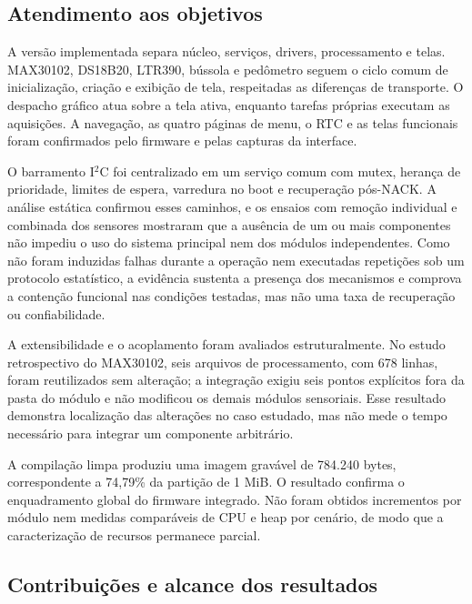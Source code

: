 \documentclass[a4paper,12pt]{article}
\begin{document}
\subsection{Atendimento aos objetivos}


A vers\~ao implementada separa n\'ucleo, servi\c{c}os, drivers, processamento e telas. MAX30102, DS18B20, LTR390, b\'ussola e ped\^ometro seguem o ciclo comum de inicializa\c{c}\~ao, cria\c{c}\~ao e exibi\c{c}\~ao de tela, respeitadas as diferen\c{c}as de transporte. O despacho gr\'afico atua sobre a tela ativa, enquanto tarefas pr\'oprias executam as aquisi\c{c}\~oes. A navega\c{c}\~ao, as quatro p\'aginas de menu, o RTC e as telas funcionais foram confirmados pelo firmware e pelas capturas da interface.


O barramento I$^2$C foi centralizado em um servi\c{c}o comum com mutex, heran\c{c}a de prioridade, limites de espera, varredura no boot e recupera\c{c}\~ao p\'os-NACK. A an\'alise est\'atica confirmou esses caminhos, e os ensaios com remo\c{c}\~ao individual e combinada dos sensores mostraram que a aus\^encia de um ou mais componentes n\~ao impediu o uso do sistema principal nem dos m\'odulos independentes. Como n\~ao foram induzidas falhas durante a opera\c{c}\~ao nem executadas repeti\c{c}\~oes sob um protocolo estat\'istico, a evid\^encia sustenta a presen\c{c}a dos mecanismos e comprova a conten\c{c}\~ao funcional nas condi\c{c}\~oes testadas, mas n\~ao uma taxa de recupera\c{c}\~ao ou confiabilidade.


A extensibilidade e o acoplamento foram avaliados estruturalmente. No estudo retrospectivo do MAX30102, seis arquivos de processamento, com 678 linhas, foram reutilizados sem altera\c{c}\~ao; a integra\c{c}\~ao exigiu seis pontos expl\'icitos fora da pasta do m\'odulo e n\~ao modificou os demais m\'odulos sensoriais. Esse resultado demonstra localiza\c{c}\~ao das altera\c{c}\~oes no caso estudado, mas n\~ao mede o tempo necess\'ario para integrar um componente arbitr\'ario.


A compila\c{c}\~ao limpa produziu uma imagem grav\'avel de 784.240 bytes, correspondente a 74,79\% da parti\c{c}\~ao de 1 MiB. O resultado confirma o enquadramento global do firmware integrado. N\~ao foram obtidos incrementos por m\'odulo nem medidas compar\'aveis de CPU e heap por cen\'ario, de modo que a caracteriza\c{c}\~ao de recursos permanece parcial.


\subsection{Contribui\c{c}\~oes e alcance dos resultados}
\end{document}

